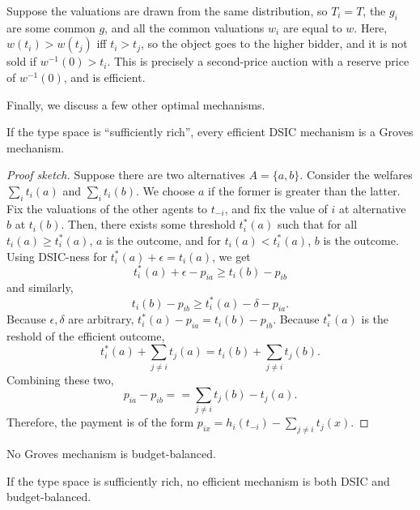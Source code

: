 		\begin{fex}
			Suppose the valuations are drawn from the same distribution, so $T_i = T$, the $g_i$ are some common $g$, and all the common valuations $w_i$ are equal to $w$. Here, $w(t_i) > w(t_j)$ iff $t_i > t_j$, so the object goes to the higher bidder, and it is not sold if $w^{-1}(0) > t_i$. This is precisely a second-price auction with a reserve price of $w^{-1}(0)$, and is efficient. 
		\end{fex}

		Finally, we discuss a few other optimal mechanisms.

		\begin{ftheo}
			If the type space is ``sufficiently rich'', every efficient DSIC mechanism is a Groves mechanism.
		\end{ftheo}
		\begin{proof}[Proof sketch]
			Suppose there are two alternatives $A = \{a,b\}$. Consider the welfares $\sum_i t_i(a)$ and $\sum_i t_i(b)$. We choose $a$ if the former is greater than the latter. Fix the valuations of the other agents to $t_{-i}$, and fix the value of $i$ at alternative $b$ at $t_i(b)$. Then, there exists some threshold $t_i^*(a)$ such that for all $t_i(a) \ge t_i^*(a)$, $a$ is the outcome, and for $t_i(a) < t_i^*(a)$, $b$ is the outcome.\\
			Using DSIC-ness for $t_i^*(a) + \epsilon = t_i(a)$, we get
			\[ t_i^*(a) + \epsilon - p_{ia} \ge t_i(b) - p_{ib} \]
			and similarly,
			\[ t_i(b) - p_{ib} \ge t_i^*(a) - \delta - p_{ia}. \]
			Because $\epsilon,\delta$ are arbitrary, $t_i^*(a) - p_{ia} = t_i(b) - p_{ib}$. Because $t_i^*(a)$ is the reshold of the efficient outcome,
			\[ t_i^*(a) + \sum_{j \ne i} t_j(a) = t_i(b) + \sum_{j \ne i} t_j(b). \]
			Combining these two,
			\[ p_{ia} - p_{ib} == \sum_{j \ne i} t_j(b) - t_j(a). \]
			Therefore, the payment is of the form $p_{ix} = h_i(t_{-i}) - \sum_{j \ne i} t_j(x)$.
		\end{proof}

		\begin{ftheo}
			No Groves mechanism is budget-balanced.
		\end{ftheo}

		\begin{fcor}
			If the type space is sufficiently rich, no efficient mechanism is both DSIC and budget-balanced. 
		\end{fcor}

